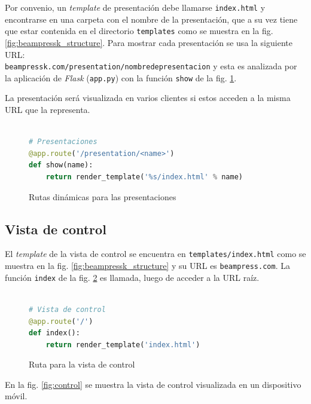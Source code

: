 			Por convenio, un \textit{template} de presentación debe llamarse \texttt{index.html} y encontrarse en una carpeta con el nombre de la presentación, que a su vez tiene que estar contenida en el directorio \texttt{templates} como se muestra en la fig. \ref{fig:beampressk_structure}. Para mostrar cada presentación se usa la siguiente URL: \\
			\texttt{beampressk.com/presentation/nombre\textendash de\textendash presentacion} y esta es analizada por la aplicación de \textit{Flask} (\texttt{app.py}) con la función \texttt{show} de la fig. \ref{fig:presentation_routes}.

			La presentación será visualizada en varios clientes si estos acceden a la misma URL que la representa. 

			\begin{figure}[htb]%
				\begin{lstlisting}[language=Python]%

# Presentaciones
@app.route('/presentation/<name>')
def show(name):
    return render_template('%s/index.html' % name)
				\end{lstlisting}
			\caption{Rutas dinámicas para las presentaciones}
			\label{fig:presentation_routes}
			\end{figure}


		\subsection{Vista de control} %
		\label{sub:vista_de_control}
			El \textit{template} de la vista de control se encuentra en \texttt{templates/index.html} como se muestra en la fig. \ref{fig:beampressk_structure} y su URL es \texttt{beampress.com}. La función \texttt{index} de la fig. \ref{fig:control_view_code} es llamada, luego de acceder a la URL raíz.

			\begin{figure}[htb]%
				\begin{lstlisting}[language=Python]%

# Vista de control
@app.route('/')
def index():
    return render_template('index.html')
				\end{lstlisting}
			\caption{Ruta para la vista de control}
			\label{fig:control_view_code}
			\end{figure}

			En la fig. \ref{fig:control} se muestra la vista de control visualizada en un dispositivo móvil.

